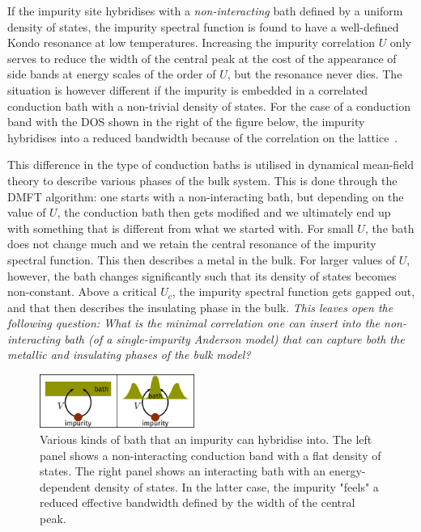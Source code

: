 \documentclass[reprint,hidelinks]{revtex4-2}
\begin{document}
If the impurity site hybridises with a {\it non-interacting} bath defined by a uniform density of states, the impurity spectral function is found to have a well-defined Kondo resonance at low temperatures. Increasing the impurity correlation \(U\) only serves to reduce the width of the central peak at the cost of the appearance of side bands at energy scales of the order of \(U\), but the resonance never dies. The situation is however different if the impurity is embedded in a correlated conduction bath with a non-trivial density of states. For the case of a conduction band with the DOS shown in the right of the figure below, the impurity hybridises into a reduced bandwidth because of the correlation on the lattice~\cite{held_2013}.

This difference in the type of conduction baths is utilised in dynamical mean-field theory to describe various phases of the bulk system.
This is done through the DMFT algorithm: one starts with a non-interacting bath, but depending on the value of \(U\), the conduction bath then gets modified and we ultimately end up with something that is different from what we started with.
For small \(U\), the bath does not change much and we retain the central resonance of the impurity spectral function.
This then describes a metal in the bulk.
For larger values of \(U\), however, the bath changes significantly such that its density of states becomes non-constant.
Above a critical \(U_c\), the impurity spectral function gets gapped out, and that then describes the insulating phase in the bulk.
\textit{This leaves open the following question: What is the minimal correlation one can insert into the non-interacting bath (of a single-impurity Anderson model) that can capture both the metallic and insulating phases of the bulk model?}

\begin{figure}[!htb]
\centering
\includegraphics[width=0.45\textwidth]{dos_diff.pdf}
\caption{Various kinds of bath that an impurity can hybridise into. The left panel shows a non-interacting conduction band with a flat density of states. The right panel shows an interacting bath with an energy-dependent density of states. In the latter case, the impurity "feels" a reduced effective bandwidth defined by the width of the central peak.}
\end{figure}
\end{document}
